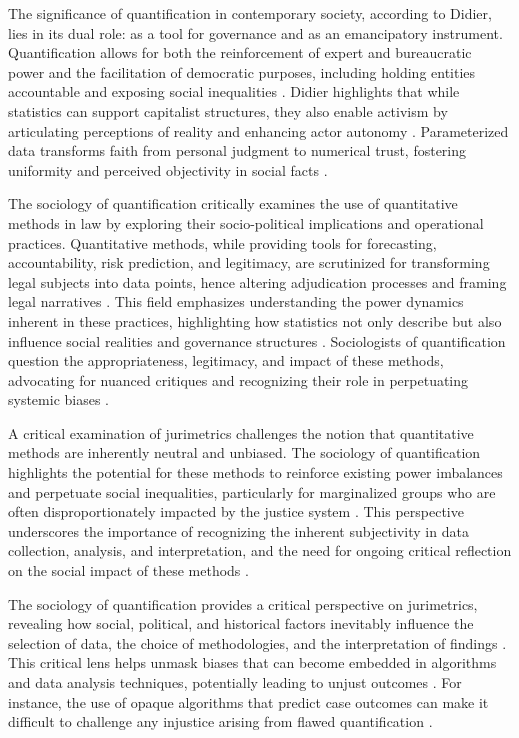 The significance of quantification in contemporary society, according to Didier, lies in its dual role: as a tool for governance and as an emancipatory instrument. Quantification allows for both the reinforcement of expert and bureaucratic power and the facilitation of democratic purposes, including holding entities accountable and exposing social inequalities \cite{demortain2019,didier2021,paiva2021}. Didier highlights that while statistics can support capitalist structures, they also enable activism by articulating perceptions of reality and enhancing actor autonomy \cite{didier2021}. Parameterized data transforms faith from personal judgment to numerical trust, fostering uniformity and perceived objectivity in social facts \cite{vernant2006}.

The sociology of quantification critically examines the use of quantitative methods in law by exploring their socio-political implications and operational practices. Quantitative methods, while providing tools for forecasting, accountability, risk prediction, and legitimacy, are scrutinized for transforming legal subjects into data points, hence altering adjudication processes and framing legal narratives \cite{lynch2019_pages_1-2,lynch2019_pages_1-1}. This field emphasizes understanding the power dynamics inherent in these practices, highlighting how statistics not only describe but also influence social realities and governance structures \cite{paiva2021_pages_3-4,saltelli2020_pages_4-4,camargo2021_pages_2-3}. Sociologists of quantification question the appropriateness, legitimacy, and impact of these methods, advocating for nuanced critiques and recognizing their role in perpetuating systemic biases \cite{gillborn2017_pages_15-16,ribeiro2021_pages_6-7}.

A critical examination of jurimetrics challenges the notion that quantitative methods are inherently neutral and unbiased. The sociology of quantification highlights the potential for these methods to reinforce existing power imbalances and perpetuate social inequalities, particularly for marginalized groups who are often disproportionately impacted by the justice system \cite{10.5040/9781350220645,10.1080/07329113.2015.1046739}. This perspective underscores the importance of recognizing the inherent subjectivity in data collection, analysis, and interpretation, and the need for ongoing critical reflection on the social impact of these methods \cite{10.5040/9781350220645,10.1080/07329113.2015.1046739}.

The sociology of quantification provides a critical perspective on jurimetrics, revealing how social, political, and historical factors inevitably influence the selection of data, the choice of methodologies, and the interpretation of findings \cite{10.1590/data.2022.65.3.267,10.3390/fi9040068}. This critical lens helps unmask biases that can become embedded in algorithms and data analysis techniques, potentially leading to unjust outcomes \cite{10.1590/data.2022.65.3.267,10.3390/fi9040068}. For instance, the use of opaque algorithms that predict case outcomes can make it difficult to challenge any injustice arising from flawed quantification \cite{10.1590/data.2022.65.3.267,10.1057/s41599-020-0396-5}.

